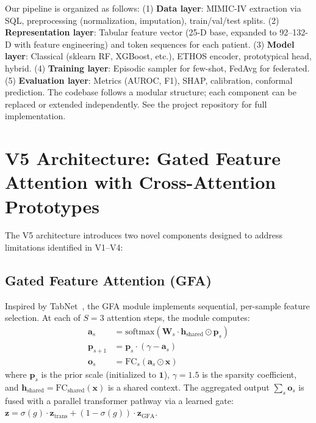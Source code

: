 Our pipeline is organized as follows: (1) \textbf{Data layer}: MIMIC-IV extraction via SQL, preprocessing (normalization, imputation), train/val/test splits. (2) \textbf{Representation layer}: Tabular feature vector (25-D base, expanded to 92--132-D with feature engineering) and token sequences for each patient. (3) \textbf{Model layer}: Classical (sklearn RF, XGBoost, etc.), ETHOS encoder, prototypical head, hybrid. (4) \textbf{Training layer}: Episodic sampler for few-shot, FedAvg for federated. (5) \textbf{Evaluation layer}: Metrics (AUROC, F1), SHAP, calibration, conformal prediction. The codebase follows a modular structure; each component can be replaced or extended independently. See the project repository for full implementation.

\section{V5 Architecture: Gated Feature Attention with Cross-Attention Prototypes}
\label{sec:v5_architecture}

The V5 architecture introduces two novel components designed to address limitations identified in V1--V4:

\subsection{Gated Feature Attention (GFA)}

Inspired by TabNet~\cite{arik2021tabnet}, the GFA module implements sequential, per-sample feature selection. At each of $S=3$ attention steps, the module computes:
\begin{align}
\mathbf{a}_s &= \text{softmax}(\mathbf{W}_s \cdot \mathbf{h}_{\text{shared}} \odot \mathbf{p}_s) \\
\mathbf{p}_{s+1} &= \mathbf{p}_s \cdot (\gamma - \mathbf{a}_s) \\
\mathbf{o}_s &= \text{FC}_s(\mathbf{a}_s \odot \mathbf{x})
\end{align}
where $\mathbf{p}_s$ is the prior scale (initialized to $\mathbf{1}$), $\gamma=1.5$ is the sparsity coefficient, and $\mathbf{h}_{\text{shared}} = \text{FC}_{\text{shared}}(\mathbf{x})$ is a shared context. The aggregated output $\sum_s \mathbf{o}_s$ is fused with a parallel transformer pathway via a learned gate: $\mathbf{z} = \sigma(g) \cdot \mathbf{z}_{\text{trans}} + (1-\sigma(g)) \cdot \mathbf{z}_{\text{GFA}}$.

